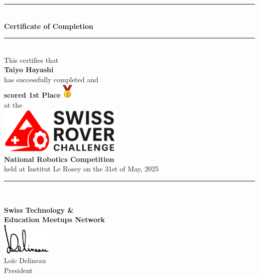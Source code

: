\documentclass[10pt]{article}
\begin{document}
\begin{center}
	\rule{10cm}{0.4pt} \\
	\vspace{1cm}
	{\LARGE \bfseries Certificate of Completion} \\
	\vspace{0.5cm}
	\rule{10cm}{0.4pt} \\
	\vspace{1.5cm}
	{\large This certifies that} \\
	\vspace{1cm}
	{\Huge \bfseries Taiyo Hayashi} \\
	\vspace{1cm}
	{\large has successfully completed and} \\
	\vspace{0.8cm}
	{\LARGE \bfseries scored 1st Place}
	\includegraphics[width=0.5cm]{gold.png} \\
	\vspace{1cm}
	{\large at the} \\
	\vspace{1cm}
	\includegraphics[width=6cm]{src.png} \\
	\vspace{1cm}
	{\LARGE \bfseries National Robotics Competition} \\
	\vspace{1cm}
	{\large held at Institut Le Rosey on the 31st of May, 2025} \\
	\vspace{1cm}
	\rule{10cm}{0.4pt} \\
\end{center}

\begin{flushright}
\end{flushright}

\vfill

\begin{center}
	\textbf{Swiss Technology \&} \\
	\textbf{Education Meetups Network} \\
	\vspace{0.3cm}
	\includegraphics[width=2.4cm]{signature-tight.png} \\
	Loïc Delineau \\
	President \\
\end{center}
\end{document}
